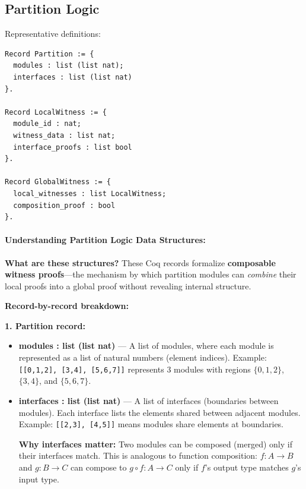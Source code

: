 \subsection{Partition Logic}

Representative definitions:
\begin{lstlisting}
Record Partition := {
  modules : list (list nat);
  interfaces : list (list nat)
}.

Record LocalWitness := {
  module_id : nat;
  witness_data : list nat;
  interface_proofs : list bool
}.

Record GlobalWitness := {
  local_witnesses : list LocalWitness;
  composition_proof : bool
}.
\end{lstlisting}

\paragraph{Understanding Partition Logic Data Structures:}

\textbf{What are these structures?} These Coq records formalize \textbf{composable witness proofs}---the mechanism by which partition modules can \textit{combine} their local proofs into a global proof without revealing internal structure.

\textbf{Record-by-record breakdown:}

\textbf{1. Partition record:}
\begin{itemize}
    \item \textbf{modules : list (list nat)} — A list of modules, where each module is represented as a list of natural numbers (element indices). Example: \texttt{[[0,1,2], [3,4], [5,6,7]]} represents 3 modules with regions $\{0,1,2\}$, $\{3,4\}$, and $\{5,6,7\}$.
    
    \item \textbf{interfaces : list (list nat)} — A list of interfaces (boundaries between modules). Each interface lists the elements shared between adjacent modules. Example: \texttt{[[2,3], [4,5]]} means modules share elements at boundaries.
    
    \textbf{Why interfaces matter:} Two modules can be composed (merged) only if their interfaces match. This is analogous to function composition: $f : A \to B$ and $g : B \to C$ can compose to $g \circ f : A \to C$ only if $f$'s output type matches $g$'s input type.
\end{itemize}

